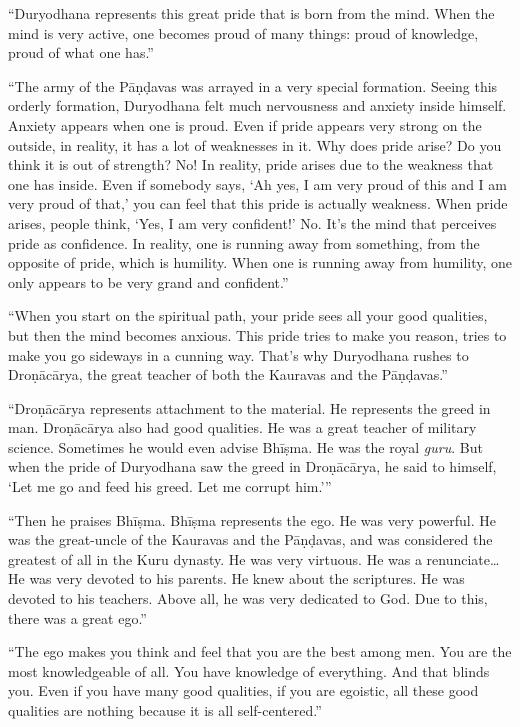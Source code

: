 \documentclass[12pt, twoside, openright]{memoir}
\begin{document}
\enquote{Duryodhana represents this great pride that is born from the mind. When the mind is very active, one becomes proud of many things: proud of knowledge, proud of what one has.}

\enquote{The army of the Pāṇḍavas was arrayed in a very special formation. Seeing this orderly formation, Duryodhana felt much nervousness and anxiety inside himself. Anxiety appears when one is proud. Even if pride appears very strong on the outside, in reality, it has a lot of weaknesses in it. Why does pride arise? Do you think it is out of strength? No! In reality, pride arises due to the weakness that one has inside. Even if somebody says, \enquote{Ah yes, I am very proud of this and I am very proud of that,} you can feel that this pride is actually weakness. When pride arises, people think, \enquote{Yes, I am very confident!} No. It’s the mind that perceives pride as confidence. In reality, one is running away from something, from the opposite of pride, which is humility. When one is running away from humility, one only appears to be very grand and confident.}

\enquote{When you start on the spiritual path, your pride sees all your good qualities, but then the mind becomes anxious. This pride tries to make you reason, tries to make you go sideways in a cunning way. That’s why Duryodhana rushes to Droṇācārya, the great teacher of both the Kauravas and the Pāṇḍavas.}

\enquote{Droṇācārya represents attachment to the material. He represents the greed in man. Droṇācārya also had good qualities. He was a great teacher of military science. Sometimes he would even advise Bhīṣma. He was the royal \textit{guru}. But when the pride of Duryodhana saw the greed in Droṇācārya, he said to himself, \enquote{Let me go and feed his greed. Let me corrupt him.}}

\enquote{Then he praises Bhīṣma. Bhīṣma represents the ego. He was very powerful. He was the great-uncle of the Kauravas and the Pāṇḍavas, and was considered the greatest of all in the Kuru dynasty. He was very virtuous. He was a renunciate\ldots He was very devoted to his parents. He knew about the scriptures. He was devoted to his teachers. Above all, he was very dedicated to God. Due to this, there was a great ego.}

\enquote{The ego makes you think and feel that you are the best among men. You are the most knowledgeable of all. You have knowledge of everything. And that blinds you. Even if you have many good qualities, if you are egoistic, all these good qualities are nothing because it is all self-centered.}
\end{document}
